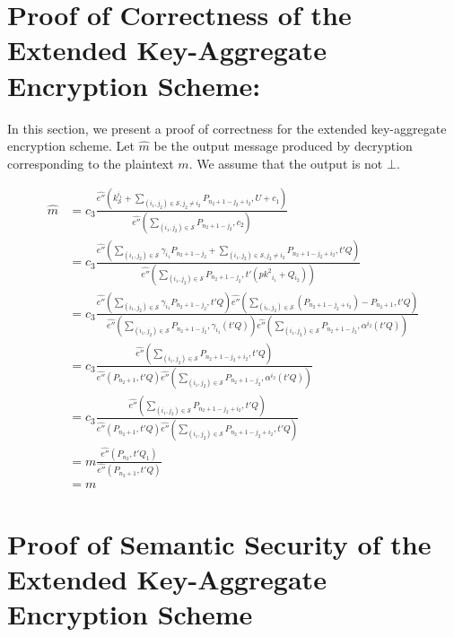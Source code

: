 \section{Proof of Correctness of the Extended Key-Aggregate Encryption Scheme:}
\label{app_sec:correct_extended}

In this section, we present a proof of correctness for the extended key-aggregate encryption scheme. Let $\hat{m}$ be the output message produced by decryption corresponding to the plaintext $m$. We assume that the output is not $\bot$. 

\begin{scriptsize}
\begin{equation}
\begin{split}
 \hat{m} &= c_3\frac{\hat{e''}(k^{i_1}_{\mathcal{S}}+\sum_{(i_1,j_2)\in\mathcal{S},j_2\neq i_2}P_{n_2+1-j_2+i_2},U+c_1)}{\hat{e''}(\sum_{(i_1,j_2)\in\mathcal{S}}P_{n_2+1-j_2},c_2)}\\
  &= c_3\frac{\hat{e''}(\sum_{(i_1,j_2)\in \mathcal{S}}{\gamma_{i_1}}P_{n_2+1-j_2} + \sum_{(i_1,j_2)\in\mathcal{S},j_2\neq i_2}P_{n_2+1-j_2+i_2},t'Q)}{\hat{e''}(\sum_{(i_1,j_2)\in\mathcal{S}}P_{n_2+1-j_2},t'({pk^2}_{i_1}+Q_{i_2}))}\\
  &= c_3\frac{\hat{e''}(\sum_{(i_1,j_2)\in \mathcal{S}}{\gamma_{i_1}}P_{n_2+1-j_2},t'Q)\hat{e''}(\sum_{(i_1,j_2)\in\mathcal{S}}(P_{n_2+1-j_2+i_2})-P_{n_2+1},t'Q)}{\hat{e''}(\sum_{(i_1,j_2)\in\mathcal{S}}P_{n_2+1-j_2},\gamma_{i_1}(t'Q))\hat{e''}(\sum_{(i_1,j_2)\in\mathcal{S}}P_{n_2+1-j_2},\alpha^{i_2}(t'Q))}\\
  &= c_3\frac{\hat{e''}(\sum_{(i_1,j_2)\in\mathcal{S}}P_{n_2+1-j_2+i_2},t'Q)}{\hat{e''}(P_{n_2+1},t'Q)\hat{e''}(\sum_{(i_1,j_2)\in\mathcal{S}}P_{n_2+1-j_2},\alpha^{i_2}(t'Q))}\\
  &= c_3\frac{\hat{e''}(\sum_{(i_1,j_2)\in\mathcal{S}}P_{n_2+1-j_2+i_2},t'Q)}{\hat{e''}(P_{n_2+1},t'Q)\hat{e''}(\sum_{(i_1,j_2)\in\mathcal{S}}P_{n_2+1-j_2+i_2},t'Q)}\\
  &= m\frac{\hat{e''}(P_{n_2},t'Q_1)}{\hat{e''}(P_{n_2+1},t'Q)}\\
  &= m
\end{split}  
\end{equation}
\end{scriptsize}

\section{Proof of Semantic Security of the Extended Key-Aggregate Encryption Scheme}
\label{app_sec:proof_extended}


